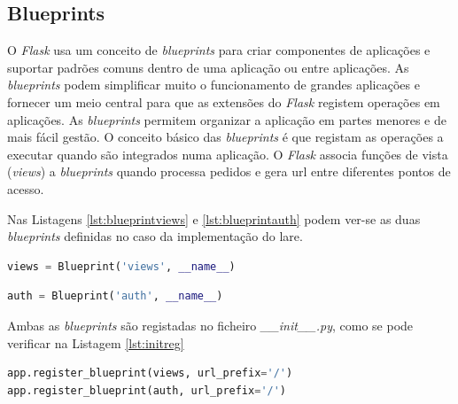 \subsection{Blueprints}
O \textit{Flask} usa um conceito de \textit{blueprints} para criar componentes de aplicações e suportar padrões comuns dentro de uma aplicação ou entre aplicações. As \textit{blueprints} podem simplificar muito o funcionamento de grandes aplicações e fornecer um meio central para que as extensões do \textit{Flask} registem operações em aplicações. As \textit{blueprints} permitem organizar a aplicação em partes menores e de mais fácil gestão. O conceito básico das \textit{blueprints} é que registam as operações a executar quando são integrados numa aplicação. O \textit{Flask} associa funções de vista (\textit{views}) a \textit{blueprints} quando processa pedidos e gera \acrshort{url} entre diferentes pontos de acesso.

Nas Listagens \ref{lst:blueprintviews} e \ref{lst:blueprintauth} podem ver-se as duas \textit{blueprints} definidas no caso da implementação do \acrshort{lare}.
\begin{center}
	\begin{minipage}{0.7\linewidth}
		\begin{lstlisting}[language=Python, caption=\textit{Blueprint views} - \textit{views.py}, label=lst:blueprintviews]
views = Blueprint('views', __name__)
\end{lstlisting}
	\end{minipage}
\end{center}

\begin{center}
	\begin{minipage}{0.7\linewidth}
		\begin{lstlisting}[language=Python, caption=\textit{Blueprint auth} - \textit{auth.py}, label=lst:blueprintauth]
auth = Blueprint('auth', __name__)
\end{lstlisting}
	\end{minipage}
\end{center}

Ambas as \textit{blueprints} são registadas no ficheiro \textit{\_\_init\_\_.py}, como se pode verificar na Listagem \ref{lst:initreg}

\begin{center}
	\begin{minipage}{0.7\linewidth}
		\begin{lstlisting}[language=Python, caption=Registo das \textit{blueprints} - \textit{\_\_init\_\_.py}, label=lst:initreg]
app.register_blueprint(views, url_prefix='/')
app.register_blueprint(auth, url_prefix='/')
\end{lstlisting}
	\end{minipage}
\end{center}

